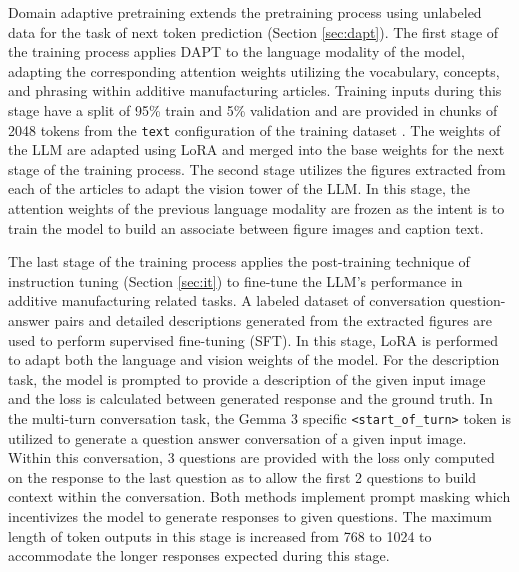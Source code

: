 Domain adaptive pretraining extends the pretraining process using unlabeled data
for the task of next token prediction (Section \ref{sec:dapt}). The first stage
of the training process applies DAPT to the language modality of the model,
adapting the corresponding attention weights utilizing the vocabulary, concepts,
and phrasing within additive manufacturing articles. Training inputs during this
stage have a split of 95\% train and 5\% validation and are provided in chunks
of 2048 tokens from the \texttt{text} configuration of the training dataset
\cite{peter_pak_additivellm2-oa_2026}. The weights of the LLM are adapted
using LoRA and merged into the base weights for the next stage of the training
process. The second stage utilizes the figures extracted from each of the
articles to adapt the vision tower of the LLM. In this stage, the attention
weights of the previous language modality are frozen as the intent is to train
the model to build an associate between figure images and caption text.

The last stage of the training process applies the post-training technique of
instruction tuning (Section \ref{sec:it}) to fine-tune the LLM's performance in
additive manufacturing related tasks. A labeled dataset of conversation
question-answer pairs and detailed descriptions generated from the extracted
figures are used to perform supervised fine-tuning (SFT). In this stage, LoRA is
performed to adapt both the language and vision weights of the model. For the
description task, the model is prompted to provide a description of the given
input image and the loss is calculated between generated response and the ground
truth. In the multi-turn conversation task, the Gemma 3 specific
\texttt{<start\_of\_turn>} token \cite{team_gemma_2025} is utilized to generate
a question answer conversation of a given input image. Within this conversation,
3 questions are provided with the loss only computed on the response to the last
question as to allow the first 2 questions to build context within the
conversation. Both methods implement prompt masking which incentivizes the model
to generate responses to given questions. The maximum length of token outputs in
this stage is increased from 768 to 1024 to accommodate the longer responses
expected during this stage.


